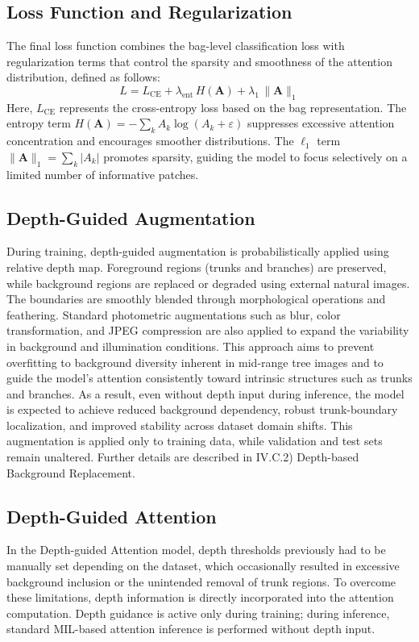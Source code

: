 \subsection{Loss Function and Regularization}
The final loss function combines the bag-level classification loss with regularization terms that control the sparsity and smoothness of the attention distribution, defined as follows:
\begin{equation}\tag{10}
L=L_{\mathrm{CE}}+\lambda_{\mathrm{ent}}\, H(\mathbf{A})+\lambda_{1}\,\lVert \mathbf{A}\rVert_{1}
\end{equation}
Here, $L_{\mathrm{CE}}$ represents the cross-entropy loss based on the bag representation. The entropy term $H(\mathbf{A})=-\sum_k A_k \log(A_k+\varepsilon)$ suppresses excessive attention concentration and encourages smoother distributions. The $\ell_1$ term $\lVert \mathbf{A}\rVert_1=\sum_k \lvert A_k\rvert$ promotes sparsity, guiding the model to focus selectively on a limited number of informative patches.

\subsection{Depth-Guided Augmentation}
During training, depth-guided augmentation is probabilistically applied using relative depth map. Foreground regions (trunks and branches) are preserved, while background regions are replaced or degraded using external natural images. The boundaries are smoothly blended through morphological operations and feathering. Standard photometric augmentations such as blur, color transformation, and JPEG compression are also applied to expand the variability in background and illumination conditions. This approach aims to prevent overfitting to background diversity inherent in mid-range tree images and to guide the model’s attention consistently toward intrinsic structures such as trunks and branches. As a result, even without depth input during inference, the model is expected to achieve reduced background dependency, robust trunk-boundary localization, and improved stability across dataset domain shifts. This augmentation is applied only to training data, while validation and test sets remain unaltered. Further details are described in IV.C.2) Depth-based Background Replacement.

\subsection{Depth-Guided Attention}
In the Depth-guided Attention model, depth thresholds previously had to be manually set depending on the dataset, which occasionally resulted in excessive background inclusion or the unintended removal of trunk regions. To overcome these limitations, depth information is directly incorporated into the attention computation. Depth guidance is active only during training; during inference, standard MIL-based attention inference is performed without depth input.

